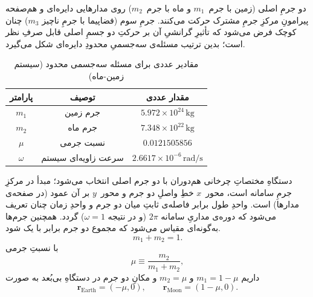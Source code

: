 دو جرمِ اصلی (زمین
با جرم~$m_{1}$ و ماه با جرم~$m_{2}$) روی مدارهایی دایره‌ای و هم‌صفحه پیرامونِ مرکزِ جرمِ مشترک حرکت می‌کنند. جرمِ سوم (فضاپیما با جرمِ ناچیز $m_{3}$) چنان کوچک فرض می‌شود که تأثیرِ گرانشیِ آن بر حرکتِ دو جسمِ اصلی قابل صرفِ نظر است؛ بدین ترتیب مسئله‌ی سه‌جسمیِ محدودِ دایره‌ای شکل می‌گیرد.



\begin{table}[H]
	\centering
	\caption{مقادیر عددی برای مسئله سه‌جسمی محدود (سیستم زمین-ماه)}
	\begin{tabular}{|c|c|c|}
		\hline
		پارامتر & توصیف & مقدار عددی \\
		\hline
		$m_1$ & جرم زمین & $5.972 \times 10^{24}\,\mathrm{kg}$ \\
		$m_2$ & جرم ماه & $7.348 \times 10^{22}\,\mathrm{kg}$ \\
		$\mu$ & نسبت جرمی & $0.0121505856$ \\
		$\omega$ & سرعت زاویه‌ای سیستم & $2.6617 \times 10^{-6}\,\mathrm{rad/s}$ \\
		\hline
	\end{tabular}
	\label{tab:params}
\end{table}



دستگاهِ مختصاتِ چرخانی هم‌دوران با دو جرم اصلی انتخاب می‌شود؛ مبدأ در مرکزِ جرمِ سامانه است، محور~$x$ خطِ واصلِ دو جرم و محور~$y$ بر آن عمود (در صفحه‌ی مدارها) است. واحدِ طول برابر فاصله‌ی ثابتِ میان دو جرم و واحدِ زمان چنان تعریف می‌شود که دوره‌ی مداریِ سامانه $2\pi$ (و در نتیجه $\omega=1$) گردد. همچنین جرم‌ها به‌گونه‌ای مقیاس می‌شود که مجموع دو جرم برابر با یک شود.
\begin{equation}
	 m_{1}+m_{2}=1.
\end{equation}
  با نسبتِ جرمی
\begin{equation}
	\mu\equiv\frac{m_{2}}{m_{1}+m_{2}},
\end{equation}
داریم $m_{1}=1-\mu$ و $m_{2}=\mu$ و مکانِ دو جرم در دستگاهِ بی‌بُعد به صورت
\begin{equation}
	\mathbf r_{\text{Earth}}=(-\mu,0),\qquad \mathbf r_{\text{Moon}}=(1-\mu,0).
\end{equation}


